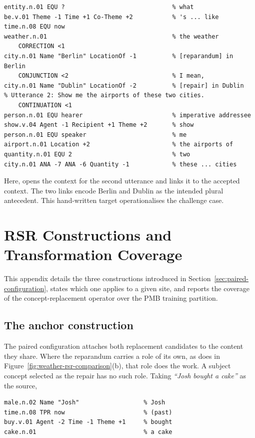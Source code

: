 \begin{lstlisting}[style=sbn]
% Utterance 1: What's the weather like in Berlin, I mean, in Dublin?
entity.n.01 EQU ?                              % what
be.v.01 Theme -1 Time +1 Co-Theme +2           % 's ... like
time.n.08 EQU now
weather.n.01                                   % the weather
    CORRECTION <1
city.n.01 Name "Berlin" LocationOf -1          % [reparandum] in Berlin
    CONJUNCTION <2                             % I mean,
city.n.01 Name "Dublin" LocationOf -2          % [repair] in Dublin
% Utterance 2: Show me the airports of these two cities.
    CONTINUATION <1
person.n.01 EQU hearer                         % imperative addressee
show.v.04 Agent -1 Recipient +1 Theme +2       % show
person.n.01 EQU speaker                        % me
airport.n.01 Location +2                       % the airports of
quantity.n.01 EQU 2                            % two
city.n.01 ANA -7 ANA -6 Quantity -1            % these ... cities
\end{lstlisting}

Here,  opens the context for the second
utterance and links it to the accepted context. The two
 links encode Berlin and Dublin as the intended plural
antecedent. This hand-written target operationalises the challenge case.

\section{RSR Constructions and Transformation Coverage}
\label{app:devices}

This appendix details the three constructions introduced in
Section~\ref{sec:paired-configuration}, states which one applies to a given
site, and reports the coverage of the concept-replacement operator over the PMB
training partition.

\subsection{The anchor construction}
\label{app:devices-anchor}

The paired configuration attaches both replacement candidates to the content
they share. Where the reparandum carries a role of its own, as
 does in Figure~\ref{fig:weather-rsr-comparison}(b), that role
does the work. A subject concept selected as the repair has no such role. Taking \textit{``Josh
bought a cake''} as the source,

\begin{lstlisting}[style=sbn]
male.n.02 Name "Josh"                  % Josh
time.n.08 TPR now                      % (past)
buy.v.01 Agent -2 Time -1 Theme +1     % bought
cake.n.01                              % a cake
\end{lstlisting}

